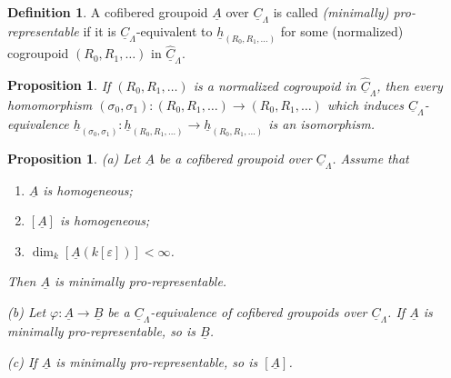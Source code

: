 \documentclass[11pt]{article}
\theoremstyle{plain}
\newtheorem{proposition}[theorem]{Proposition}
\theoremstyle{definition}
\newtheorem{definition}[theorem]{Definition}
\theoremstyle{remark}
\newcommand{\uA}{\underline{A}}\newcommand{\uH}{\underline{H}}\newcommand{\uExt}{\underline{\operatorname{Ext}}}\newcommand{\uL}{\underline{L}}\newcommand{\uM}{\underline{M}}\newcommand{\uZ}{\underline{Z}}\newcommand{\uB}{\underline{B}}\newcommand{\uC}{\underline{C}}\newcommand{\uD}{\underline{D}}\newcommand{\uE}{\underline{E}}\newcommand{\uG}{\underline{G}}\newcommand{\uP}{\underline{P}}\newcommand{\uQ}{\underline{Q}}
\begin{document}
\begin{definition}
A cofibered groupoid $\uA$ over $\underline{C}_{\Lambda}$ is called \emph{(minimally) pro-representable} if it is $\underline{C}_{\Lambda}$-equivalent to $\underline{h}_{(R_0, R_1, \ldots)}$ for some (normalized) cogroupoid $(R_0, R_1, \ldots)$ in $\widehat{\underline{C}}_{\Lambda}$.
\end{definition}

\begin{proposition}
If $(R_0, R_1, \ldots)$ is a normalized cogroupoid in $\widehat{\underline{C}}_{\Lambda}$, then every homomorphism $(\sigma_0, \sigma_1) : (R_0, R_1, \ldots) \to (R_0, R_1, \ldots)$ which induces $\underline{C}_{\Lambda}$-equivalence $\underline{h}_{(\sigma_0, \sigma_1)} : \underline{h}_{(R_0, R_1, \ldots)} \longrightarrow \underline{h}_{(R_0, R_1, \ldots)}$ is an isomorphism.
\end{proposition}

\begin{proposition}
\textup{(a)} Let $\uA$ be a cofibered groupoid over $\underline{C}_{\Lambda}$. Assume that
\begin{enumerate}
\item[(i)] $\uA$ is homogeneous;
\item[(ii)] $[\uA]$ is homogeneous;
\item[(iii)] $\dim_k [\uA(k[\varepsilon])] < \infty$.
\end{enumerate}
Then $\uA$ is minimally pro-representable.

\textup{(b)} Let $\varphi : \uA \to \uB$ be a $\underline{C}_{\Lambda}$-equivalence of cofibered groupoids over $\underline{C}_{\Lambda}$. If $\uA$ is minimally pro-representable, so is $\uB$.

\textup{(c)} If $\uA$ is minimally pro-representable, so is $[\uA]$.
\end{proposition}
\end{document}
